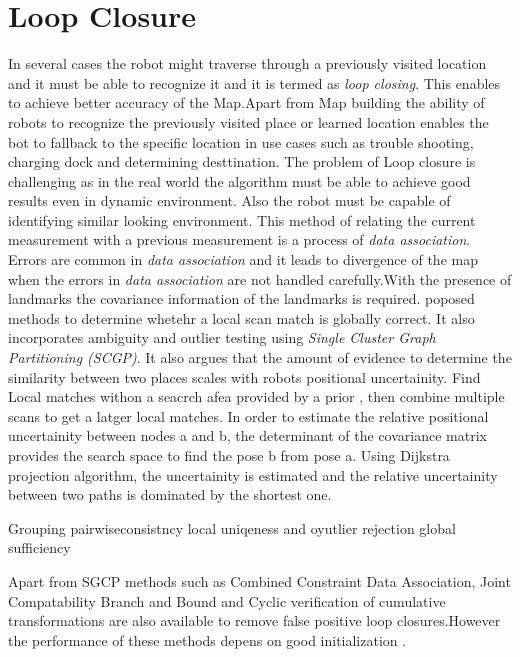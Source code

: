 \section{Loop Closure}
In several cases the robot might traverse through a previously visited location and it must be able to recognize it and it is termed as \textit{loop closing}. This enables to 
achieve better accuracy of the Map.Apart from Map building the ability of robots to recognize the previously visited place or learned location enables the bot to fallback to 
the specific location in use cases such as trouble shooting, charging dock and determining desttination. 
The problem of Loop closure is challenging as in the real world the algorithm must be able to achieve good results even in dynamic environment. Also the robot must be capable 
of identifying similar looking environment. This method of relating the current measurement with a previous measurement is a process of \textit{data association}. Errors are 
common in \textit{data association} and it leads to divergence of the map when the errors in \textit{data association} are not handled carefully.With the presence of landmarks 
the covariance information of the landmarks is required.
\cite{E.Olson/LocalSM} poposed methods to determine whetehr a local scan match is globally correct. It also incorporates ambiguity and outlier testing using 
\textit{Single Cluster Graph Partitioning (SCGP)}. It also argues that the amount of evidence to determine the similarity between two places scales with robots positional uncertainity.
Find Local matches withon a seacrch afea provided by a prior , then combine multiple scans to get a latger local matches.
In order to estimate the relative positional uncertainity between nodes a and b, the determinant of the covariance matrix provides the search space to find the pose b from pose a.
Using Dijkstra projection algorithm, the uncertainity is estimated and the relative uncertainity between two paths is dominated by the shortest one. 

Grouping
pairwiseconsistncy
local uniqeness and oyutlier rejection
global sufficiency

Apart from SGCP methods such as Combined Constraint Data Association, Joint Compatability Branch and Bound and Cyclic verification of cumulative transformations are also available
to remove false positive loop closures.However the performance of these methods depens on good initialization \cite{P.Agarwal}.
